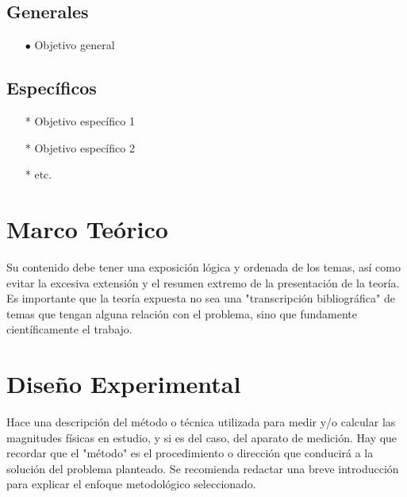 \documentclass[osajnl,twocolumn,showpacs,superscriptaddress,10pt]{revtex4-1}
\begin{document}
\subsection{Generales}

\begin{itemize}
    \item[$\bullet$] Objetivo general
\end{itemize}

\subsection{Específicos}

\begin{itemize}
    \item[*] Objetivo específico 1
    \item[*] Objetivo específico 2
    \item[*] etc.
\end{itemize}
 
 
\section{Marco Teórico}

    Su contenido debe tener una exposición lógica y ordenada de los temas, así como evitar la excesiva extensión y el resumen extremo de la presentación de la teoría. Es importante que la teoría expuesta no sea una "transcripción bibliográfica" de temas que tengan alguna relación con el problema, sino que fundamente científicamente el trabajo.\\


\section{Diseño Experimental}

    Hace una descripción del método o técnica utilizada para medir y/o calcular las magnitudes físicas en estudio, y si es del caso, del aparato de medición. Hay que recordar que el "método" es el procedimiento o dirección que conducirá a la solución del problema planteado. Se recomienda redactar una breve introducción para explicar el enfoque metodológico seleccionado.\\
\end{document}

